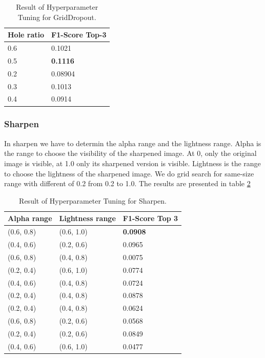 \begin{table}[ht]
    \centering
    \caption{Result of Hyperparameter Tuning for GridDropout.}
    \begin{tabular}{ll}
    \toprule
        Hole ratio & F1-Score Top-3  \\ \midrule
        0.6 & 0.1021  \\ 
        0.5 & \textbf{0.1116}  \\ 
        0.2 & 0.08904  \\ 
        0.3 & 0.1013  \\ 
        0.4 & 0.0914  \\
        \bottomrule
    \end{tabular}
    \label{tab:griddropout_hp}
\end{table}

\subsubsection{Sharpen}
In sharpen we have to determin the alpha range and the lightness range. Alpha is the range to choose the visibility of the sharpened image. At 0, only the original image is visible, at 1.0 only its sharpened version is visible. Lightness is the range to choose the lightness of the sharpened image. We do grid search for same-size range with different of 0.2 from 0.2 to 1.0. The results are presented in table \ref{tab:sharpen_hp}
\begin{table}[!ht]
    \centering
    \caption{Result of Hyperparameter Tuning for Sharpen.}
    \begin{tabular}{lll}
    \toprule
        Alpha range & Lightness range & F1-Score Top 3 \\ \midrule
        (0.6, 0.8) & (0.6, 1.0)& \textbf{0.0908} \\ 
        (0.4, 0.6) & (0.2, 0.6)& 0.0965 \\ 
        (0.6, 0.8) & (0.4, 0.8)& 0.0075 \\ 
        (0.2, 0.4) & (0.6, 1.0) & 0.0774 \\ 
        (0.4, 0.6) & (0.4, 0.8)& 0.0724 \\ 
        (0.2, 0.4) & (0.4, 0.8)& 0.0878 \\ 
        (0.2, 0.4) & (0.4, 0.8) & 0.0624 \\ 
        (0.6, 0.8) & (0.2, 0.6) & 0.0568 \\ 
        (0.2, 0.4) & (0.2, 0.6) & 0.0849 \\ 
        (0.4, 0.6) & (0.6, 1.0) & 0.0477 \\ 
        \bottomrule
    \end{tabular}
    \label{tab:sharpen_hp}
\end{table}

